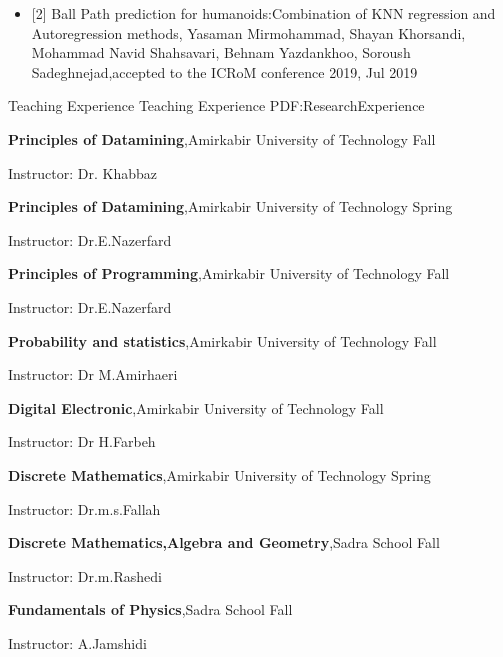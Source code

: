 \documentclass[letterpaper,MMMyyyy,nonstopmode]{simpleresumecv}
\begin{document}
\begin{Body}
\begin{itemize}
\item
{[2] Ball Path prediction for humanoids:Combination of KNN regression and Autoregression methods, Yasaman Mirmohammad, Shayan Khorsandi, Mohammad Navid Shahsavari, Behnam Yazdankhoo, Soroush Sadeghnejad,accepted to the ICRoM conference 2019, Jul 2019}
\end{itemize}



\Section
{Teaching Experience}
{Teaching Experience}
{PDF:ResearchExperience}

\Entry
\textbf{Principles of Datamining},Amirkabir University of Technology
\hfill
Fall 

\BulletItem
Instructor: Dr. Khabbaz

\Entry
\textbf{Principles of Datamining},Amirkabir University of Technology
\hfill
Spring 

\BulletItem
Instructor: Dr.E.Nazerfard

\Entry
\textbf{Principles of Programming},Amirkabir University of Technology
\hfill
Fall

\BulletItem
Instructor: Dr.E.Nazerfard

\Entry
\textbf{Probability and statistics},Amirkabir University of Technology
\hfill
Fall

\BulletItem
Instructor: Dr M.Amirhaeri

\Entry
\textbf{Digital Electronic},Amirkabir University of Technology
\hfill
Fall

\BulletItem
Instructor: Dr H.Farbeh


\Entry
\textbf{Discrete Mathematics},Amirkabir University of Technology
\hfill
Spring 

\BulletItem
Instructor: Dr.m.s.Fallah


\Entry
\textbf{Discrete Mathematics,Algebra and Geometry},Sadra School
\hfill
Fall 

\BulletItem
Instructor: Dr.m.Rashedi



\Entry
\textbf{Fundamentals of Physics},Sadra School
\hfill
Fall 

\BulletItem
Instructor: A.Jamshidi





\end{Body}
\end{document}
